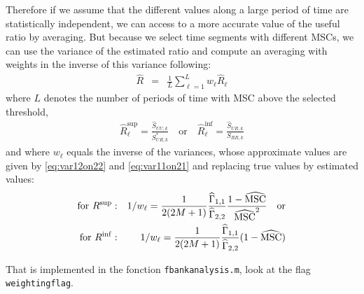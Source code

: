 Therefore if we assume that the different values along a large period of time are statistically independent, we can access to a more accurate value of the useful ratio by averaging. But because we select time segments with different MSCs, we can use the variance of the estimated ratio and compute an averaging with weights in the inverse of this variance following:
\begin{eqnarray}
\label{eq:weithted-average-Ratio}
 \hat R &=& \frac{1}{L}\sum_{\ell=1}^{L}w_{\ell}\hat R_{\ell}
\end{eqnarray}
where $L$ denotes the number of periods of time with MSC above the selected threshold,
\begin{eqnarray}
\label{eq:estimated-Ratio}
\hat R_{\ell} ^{\sup}=\frac{\hat S_{UU,k}}{S^{*}_{UR,k}}
\quad
\mathrm{or}
\quad
\hat R_{\ell}^{\inf} =\frac{\hat S_{UR,k}}{S_{RR,k}}
\end{eqnarray}
and where $w_{\ell}$ equals the inverse of the variances, whose approximate values are given by \eqref{eq:var12on22} and \eqref{eq:var11on21} and replacing true values by estimated values:
\begin{eqnarray}
\label{eq:weights}
\mathrm{for}\,\, R^{\sup}:  &&1/w_{\ell}=\frac{1}{2(2M+1)}\frac{\widehat\Gamma_{1,1}}{\widehat\Gamma_{2,2}}
  \frac{1-\widehat{\mathrm{MSC}}}{\widehat{\mathrm{MSC}}^{2}}
\quad\mathrm{or}\\
\mathrm{for }\,\, R^{\inf}:  && 1/w_{\ell}= \frac{1}{2(2M+1)}
   \frac{\widehat\Gamma_{1,1}}{\widehat\Gamma_{2,2}} (1-\widehat{\mathrm{MSC}})
\end{eqnarray}

That is implemented in the fonction {\tt fbankanalysis.m}, look at the flag {\tt weightingflag}.



